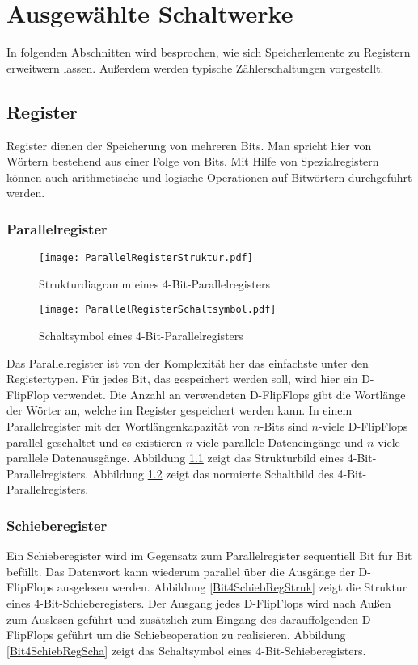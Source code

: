 \chapter{Ausgewählte Schaltwerke}
In folgenden Abschnitten wird besprochen, wie sich Speicherlemente zu Registern erweitwern lassen. Außerdem werden typische Zählerschaltungen vorgestellt.

\section{Register}
Register dienen der Speicherung von mehreren Bits. Man spricht hier von Wörtern bestehend aus einer Folge von Bits. Mit Hilfe von Spezialregistern können auch arithmetische und logische Operationen auf Bitwörtern durchgeführt werden.

\subsection{Parallelregister}
\begin{figure}[htp]
	\centering
	\texttt{[image: ParallelRegisterStruktur.pdf]}
	\caption{Strukturdiagramm eines 4-Bit-Parallelregisters}
	\label{Bit4ParRegStruk}
\end{figure}

\begin{figure}[htp]
	\centering
	\texttt{[image: ParallelRegisterSchaltsymbol.pdf]}
	\caption{Schaltsymbol eines 4-Bit-Parallelregisters}
	\label{Bit4ParRegScha}
\end{figure}
Das Parallelregister ist von der Komplexität her das einfachste unter den Registertypen. Für jedes Bit, das gespeichert werden soll, wird hier ein D-FlipFlop verwendet. Die Anzahl an verwendeten D-FlipFlops gibt die Wortlänge der Wörter an, welche im Register gespeichert werden kann.
In einem Parallelregister mit der Wortlängenkapazität von $n$-Bits sind $n$-viele D-FlipFlops parallel geschaltet und es existieren $n$-viele parallele Dateneingänge und $n$-viele parallele Datenausgänge. Abbildung \ref{Bit4ParRegStruk} zeigt das Strukturbild eines 4-Bit-Parallelregisters. Abbildung \ref{Bit4ParRegScha} zeigt das normierte Schaltbild des 4-Bit-Parallelregisters.


\subsection{Schieberegister} 
Ein Schieberegister wird im Gegensatz zum Parallelregister sequentiell Bit für Bit befüllt. Das Datenwort kann wiederum parallel über die Ausgänge der D-FlipFlops ausgelesen werden. Abbildung \ref{Bit4SchiebRegStruk} zeigt die Struktur eines 4-Bit-Schieberegisters. Der Ausgang jedes D-FlipFlops wird nach Außen zum Auslesen geführt und zusätzlich zum Eingang des darauffolgenden D-FlipFlops geführt um die Schiebeoperation zu realisieren. Abbildung \ref{Bit4SchiebRegScha} zeigt das Schaltsymbol eines 4-Bit-Schieberegisters.

